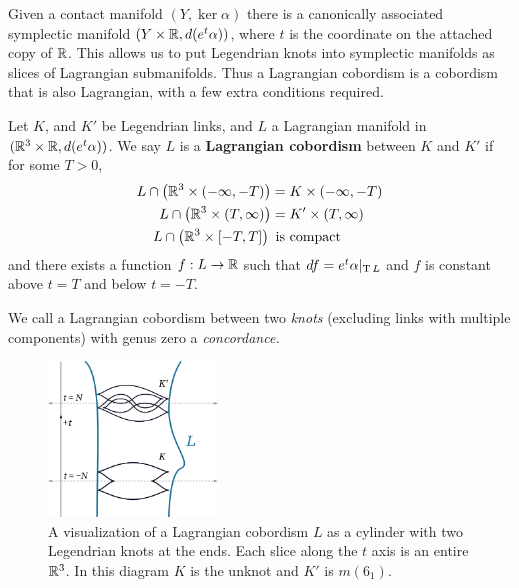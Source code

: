 
Given a contact manifold $(Y, \ker \alpha)$ there is a canonically associated symplectic manifold $(Y \times \mathbb{R}, d(e^t \alpha))$, where $t$ is the coordinate on the attached copy of $\mathbb{R}$. This allows us to put Legendrian knots into symplectic manifolds as slices of Lagrangian submanifolds. Thus a Lagrangian cobordism is a cobordism that is also Lagrangian, with a few extra conditions required.

\begin{definition}
    Let $K$, and $K'$ be Legendrian links, and $L$ a Lagrangian manifold in $(\mathbb{R}^3 \times \mathbb{R}, d(e^t \alpha))$. We say $L$ is a \textbf{Lagrangian cobordism} between $K$ and $K'$ if for some $T > 0$,
    \begin{align*}
        L \cap \left(\mathbb{R}^3 \times (-\infty, -T)\right) &= K \times (-\infty, -T)\\
        L \cap \left(\mathbb{R}^3 \times (T, \infty)\right) &= K' \times (T, \infty)\\
        L \cap \left(\mathbb{R}^3 \times [-T, T] \right)\, &\,\, \text{is compact}
    \end{align*}
    and there exists a function $f: L \to \mathbb{R}$ such that $df = e^t \alpha |_{\operatorname{T} L}$ and $f$ is constant above $t = T$ and below $t = -T$.

    We call a Lagrangian cobordism between two \emph{knots} (excluding links with multiple components) with genus zero a \emph{concordance.}
\end{definition}

\begin{figure}[ht]
    \centering
    \includegraphics[width=0.4\textwidth]{images/cobordism-visualization.pdf}
    \caption{A visualization of a Lagrangian cobordism $L$ as a cylinder with two Legendrian knots at the ends. Each slice along the $t$ axis is an entire $\mathbb{R}^3$. In this diagram $K$ is the unknot and $K'$ is $m(6_1)$.}%
    \label{fig:cobordism-vis}
\end{figure}

